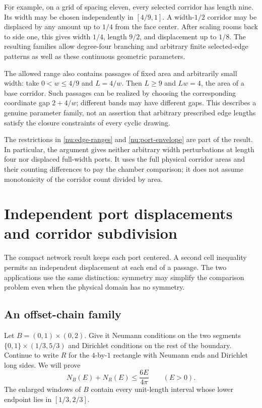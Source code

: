 \documentclass[11pt,reqno]{amsart}
\numberwithin{equation}{section}
\begin{document}
For example, on a grid of spacing eleven, every selected corridor has
length nine. Its width may be chosen independently in $[4/9,1]$.
A width-$1/2$ corridor may be displaced by any amount up to $1/4$
from the face center. After scaling rooms back to side one, this gives
width $1/4$, length $9/2$, and displacement up to $1/8$. The resulting
families allow degree-four branching and arbitrary finite selected-edge
patterns as well as these continuous geometric parameters.

The allowed range also contains passages of fixed area and arbitrarily
small width: take $0<w\le4/9$ and $L=4/w$. Then $L\ge9$ and $Lw=4$,
the area of a base corridor. Such passages can be realized by choosing
the corresponding coordinate gap $2+4/w$; different bands may have
different gaps. This describes a genuine parameter family, not an
assertion that arbitrary prescribed edge lengths satisfy the closure
constraints of every cyclic drawing.

The restrictions in \eqref{nu:edge-ranges} and
\eqref{nu:port-envelope} are part of the result. In particular, the
argument gives neither arbitrary width perturbations at length four
nor displaced full-width ports. It uses the full physical corridor
areas and their counting differences to pay the chamber comparison;
it does not assume monotonicity
of the corridor count divided by area.

\section{Independent port displacements and corridor subdivision}
\label{sec:chains}

The compact network result keeps each port centered. A second cell
inequality permits an independent displacement at each end of a passage.
The two applications use the same distinction: symmetry may simplify
the comparison problem even when the physical domain has no symmetry.

\subsection{An offset-chain family}

Let $B=(0,1)\times(0,2)$. Give it Neumann conditions on the two
segments $\{0,1\}\times(1/3,5/3)$ and Dirichlet conditions on the
rest of the boundary. Continue to write $R$ for the $4$-by-$1$
rectangle with Neumann ends and Dirichlet long sides. We will prove
\begin{equation}\label{ch:module}
 N_B(E)+N_R(E)\le\frac{6E}{4\pi}\qquad(E>0).
\end{equation}
The enlarged windows of $B$ contain every unit-length interval
whose lower endpoint lies in $[1/3,2/3]$.
\end{document}
